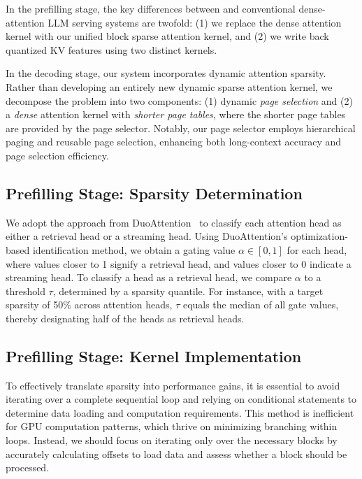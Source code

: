 In the prefilling stage, the key differences between \system and conventional dense-attention LLM serving systems are twofold: (1) we replace the dense attention kernel with our unified block sparse attention kernel, and (2) we write back quantized KV features using two distinct kernels. 

In the decoding stage, our system incorporates dynamic attention sparsity. Rather than developing an entirely new dynamic sparse attention kernel, we decompose the problem into two components: (1) dynamic \textit{page selection} and (2) a \textit{dense} attention kernel with \textit{shorter page tables}, where the shorter page tables are provided by the page selector. Notably, our page selector employs hierarchical paging and reusable page selection, enhancing both long-context accuracy and page selection efficiency.



\subsection{Prefilling Stage: Sparsity Determination}

We adopt the approach from DuoAttention~\cite{xiao2024duoattention} to classify each attention head as either a retrieval head or a streaming head. Using DuoAttention's optimization-based identification method, we obtain a gating value $\alpha \in [0, 1]$ for each head, where values closer to 1 signify a retrieval head, and values closer to 0 indicate a streaming head. To classify a head as a retrieval head, we compare $\alpha$ to a threshold $\tau$, determined by a sparsity quantile. For instance, with a target sparsity of 50$\%$ across attention heads, $\tau$ equals the median of all gate values, thereby designating half of the heads as retrieval heads.

\subsection{Prefilling Stage: Kernel Implementation}

To effectively translate sparsity into performance gains, it is essential to avoid iterating over a complete sequential loop and relying on conditional statements to determine data loading and computation requirements. This method is inefficient for GPU computation patterns, which thrive on minimizing branching within loops. Instead, we should focus on iterating only over the necessary blocks by accurately calculating offsets to load data and assess whether a block should be processed.

